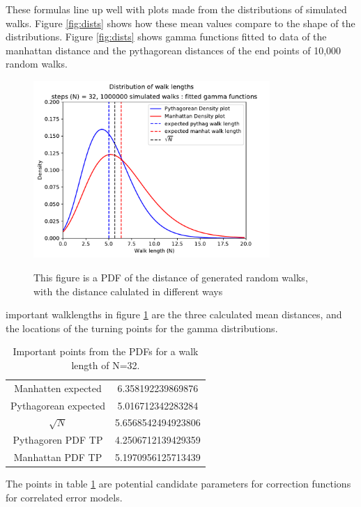 	These formulas line up well with plots made from the distributions of simulated walks. 
	Figure \ref{fig:dists} shows how these mean values compare to the shape of the distributions. Figure \ref{fig:dists} shows gamma functions fitted to data of the manhattan distance and the pythagorean distances of the end points of 10,000 random walks. 
	
	\begin{figure}
		\centering
		\includegraphics[width = 0.8\textwidth]{figs/randomwalkdistribution_1000000_32}
		\label{fig:randomwalkdistributions}
		\caption{This figure is a PDF of the distance of generated random walks, with the distance calulated in different ways}
	\end{figure}
	important walklengths in figure \ref{fig:randomwalkdistributions} are the three calculated mean distances, and the locations of the turning points for the gamma distributions. 
	\begin{table}
	\centering
	\begin{tabular}{c c}
	Manhatten expected&  6.358192239869876\\ 
	Pythagorean expected&  5.016712342283284\\ 
	$\sqrt{N}$ &  5.6568542494923806\\ 
	Pythagoren PDF TP &  4.2506712139429359\\ 
	Manhattan PDF TP &  5.1970956125713439\\ 
	\end{tabular} 
	\caption{Important points from the PDFs for a walk length of N=32. }
	\label{tab:candidates}
	\end{table}
	The points in table \ref{tab:candidates} are potential candidate parameters for correction functions for correlated error models. 


